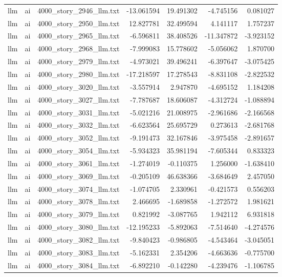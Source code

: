 \begin{longtable}{lllrrrr}
llm & ai & 4000\_story\_2946\_llm.txt & -13.061594 & 19.491302 & -4.745156 & 0.081027 \\
llm & ai & 4000\_story\_2950\_llm.txt & 12.827781 & 32.499594 & 4.141117 & 1.757237 \\
llm & ai & 4000\_story\_2965\_llm.txt & -6.596811 & 38.408526 & -11.347872 & -3.923152 \\
llm & ai & 4000\_story\_2968\_llm.txt & -7.999083 & 15.778602 & -5.056062 & 1.870700 \\
llm & ai & 4000\_story\_2979\_llm.txt & -4.973021 & 39.496241 & -6.397647 & -3.075425 \\
llm & ai & 4000\_story\_2980\_llm.txt & -17.218597 & 17.278543 & -8.831108 & -2.822532 \\
llm & ai & 4000\_story\_3020\_llm.txt & -3.557914 & 2.947870 & -4.695152 & 1.184208 \\
llm & ai & 4000\_story\_3027\_llm.txt & -7.787687 & 18.606087 & -4.312724 & -1.088894 \\
llm & ai & 4000\_story\_3031\_llm.txt & -5.021216 & 21.008975 & -2.961686 & -2.166568 \\
llm & ai & 4000\_story\_3032\_llm.txt & -6.623564 & 25.695729 & 0.273613 & -2.681768 \\
llm & ai & 4000\_story\_3052\_llm.txt & -9.191473 & 32.167846 & -3.975458 & -2.891657 \\
llm & ai & 4000\_story\_3054\_llm.txt & -5.934323 & 35.981194 & -7.605344 & 0.833323 \\
llm & ai & 4000\_story\_3061\_llm.txt & -1.274019 & -0.110375 & 1.256000 & -1.638410 \\
llm & ai & 4000\_story\_3069\_llm.txt & -0.205109 & 46.638366 & -3.684649 & 2.457050 \\
llm & ai & 4000\_story\_3074\_llm.txt & -1.074705 & 2.330961 & -0.421573 & 0.556203 \\
llm & ai & 4000\_story\_3078\_llm.txt & 2.466695 & -1.689858 & -1.272572 & 1.981621 \\
llm & ai & 4000\_story\_3079\_llm.txt & 0.821992 & -3.087765 & 1.942112 & 6.931818 \\
llm & ai & 4000\_story\_3080\_llm.txt & -12.195233 & -5.892063 & -7.514640 & -4.274576 \\
llm & ai & 4000\_story\_3082\_llm.txt & -9.840423 & -0.986805 & -4.543464 & -3.045051 \\
llm & ai & 4000\_story\_3083\_llm.txt & -5.162331 & 2.354206 & -4.663636 & -0.775700 \\
llm & ai & 4000\_story\_3084\_llm.txt & -6.892210 & -0.142280 & -4.239476 & -1.106785 \\

\end{longtable}
